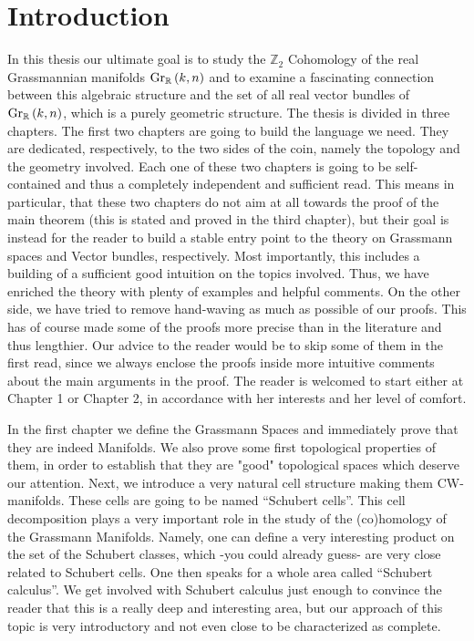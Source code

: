 \chapter*{Introduction}
In this thesis our ultimate goal is to study the $\mathbb{Z}_2$ Cohomology of the real Grassmannian manifolds $\Gr{k}{n}{\mathbb{R}}$ and to examine a fascinating connection between this algebraic structure and the set of all real vector bundles of $\Gr{k}{n}{\mathbb{R}}$, which is a purely geometric structure. The thesis is divided in three chapters.
The first two chapters are going to build the language we need. They are dedicated, respectively, to the two sides of the coin, namely the topology and the geometry involved. Each one of these two chapters is going to be self-contained and thus a completely independent and sufficient read. This means in particular, that these two chapters do not aim at all towards the proof of the main theorem (this is stated and proved in the third chapter), but their goal is instead for the reader to build a stable entry point to the theory on Grassmann spaces and Vector bundles, respectively. Most importantly, this includes a building of a sufficient good intuition on the topics involved. Thus, we have enriched the theory with plenty of examples and helpful comments. On the other side, we have tried to remove hand-waving as much as possible of our proofs. This has of course made some of the proofs more precise than in the literature and thus lengthier. Our advice to the reader would be to skip some of them in the first read, since we always enclose the proofs inside more intuitive comments about the main arguments in the proof.
The reader is welcomed to start either at Chapter 1 or Chapter 2, in accordance with her interests and her level of comfort. 

In the first chapter we define the Grassmann Spaces and immediately prove that they are indeed Manifolds. We also prove some first topological properties of them, in order to establish that they are "good" topological spaces which deserve our attention. Next, we introduce a very natural cell structure making them CW-manifolds. These cells are going to be named ``Schubert cells''. This cell decomposition plays a very important role in the study of the (co)homology of the Grassmann Manifolds. Namely, one can define a very interesting product on the set of the Schubert classes, which -you could already guess- are very close related to Schubert cells. One then speaks for a whole area called ``Schubert calculus''. We get involved with Schubert calculus just enough to convince the reader that this is a really deep and interesting area, but our approach of this topic is very introductory and not even close to be characterized as complete.

